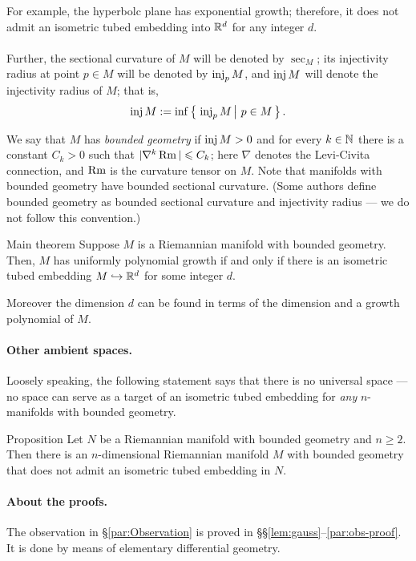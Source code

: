 \documentclass[a4paper,10pt]{article}
\begin{document}
For example,
the hyperbolc plane has exponential growth;
therefore, it does not admit an isometric tubed embedding into $\mathbb{R}^d$ for any integer $d$.




\paragraph{}\label{par:main} 
Further, the sectional curvature of $M$ will be denoted by $\sec_M$;
its injectivity radius at point $p\in M$ will be denoted by $\operatorname{\rm inj}_pM$, and $\operatorname{\rm inj} M$ will denote the injectivity radius of $M$; that is, 
\[\inj M\df \inf\set{\inj_pM}{p\in M}.\]

We say that $M$ has \emph{bounded geometry} if $\operatorname{\rm inj} M>0$ and for every $k\in\mathbb{N}$ there is a constant $C_k > 0$ such that $|\nabla^k \operatorname{\rm Rm}| \leqslant C_k$;
here $\nabla$ denotes the Levi-Civita connection, and $\operatorname{\rm Rm}$ is the curvature tensor on $M$.
Note that manifolds with bounded geometry have bounded sectional curvature.
(Some authors define bounded geometry as bounded sectional curvature and injectivity radius --- we do not follow this convention.)

\begin{thm}{Main theorem}
Suppose $M$ is a Riemannian manifold with bounded geometry.
Then, $M$ has uniformly  polynomial growth
if and only if there is an isometric tubed embedding $M \hookrightarrow \mathbb{R}^d$ for some integer $d$.

Moreover the dimension $d$ can be found in terms of the dimension and a growth polynomial of $M$.
\end{thm}

\paragraph{Other ambient spaces.}\label{par:other-intro}
Loosely speaking, the following statement says that there is no universal space --- no space can serve as a target of an isometric tubed embedding for \textit{any} $n$-manifolds with bounded geometry.

\begin{thm}{Proposition}
Let $N$ be a Riemannian manifold with bounded geometry and $n\ge 2$.
Then there is an $n$-dimensional  Riemannian manifold $M$ with bounded geometry that does not admit an isometric tubed embedding in $N$.
\end{thm}

\paragraph{About the proofs.}
The observation in §\ref{par:Observation} is proved in §§\ref{lem:gauss}--\ref{par:obs-proof}.
It is done by means of elementary differential geometry.
\end{document}
